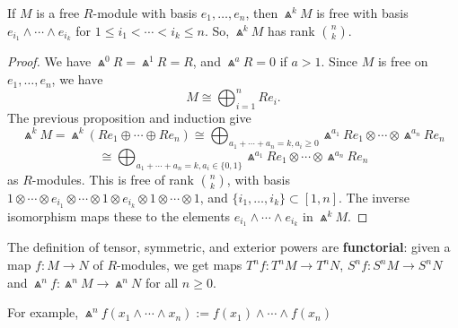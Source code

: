 \begin{cor}
    If $M$ is a free $R$-module with basis $e_1,\dots,e_n$, then $\Wedge^kM$ is free with basis $e_{i_1}\land \cdots \land e_{i_k}$ for $1 \leq i_1 < \cdots < i_k \leq n$. So, $\Wedge ^kM$ has rank $\binom{n}{k}$.
\end{cor}
\begin{proof}
    We have $\Wedge ^0R = \Wedge ^1R=R$, and $\Wedge^ aR =0$ if $a>1$. Since $M$ is free on $e_1,\dots,e_n$, we have
    $$ M \cong \bigoplus_{i=1}^nRe_i.$$
    The previous proposition and induction give
    $$\Wedge^kM = \Wedge^k(Re_1\oplus \cdots \oplus Re_n) \cong \bigoplus _{a_1+\cdots + a_n=k,a_i \geq 0}\Wedge^{a_1}Re_1 \otimes \cdots \otimes \Wedge^{a_n}Re_n$$
    $$\cong \bigoplus _{a_1+\cdots + a_n =k,a_i \in \{0,1\}} \Wedge^{a_1}Re_1 \otimes \cdots \otimes \Wedge^{a_n}Re_n$$
    as $R$-modules. This is free of rank $\binom{n}{k}$, with basis $1 \otimes \cdots \otimes e_{i_1}\otimes \cdots \otimes 1 \otimes e_{i_k}\otimes 1 \otimes \cdots \otimes 1$, and $\{ i_1,\dots,i_k\} \subset [1,n]$. The inverse isomorphism maps these to the elements $e_{i_1}\land \cdots \land e_{i_k}$ in $\Wedge^kM$.
\end{proof}

\begin{rmk}
    The definition of tensor, symmetric, and exterior powers are \textbf{functorial}: given a map $f : M \to N$ of $R$-modules, we get maps $T^nf:T^nM \to T^nN$, $S^nf : S^nM \to S^nN$ and $\Wedge ^nf : \Wedge ^nM \to \Wedge ^nN$ for all $n \geq 0$.

    For example, $\Wedge^nf(x_1\land \cdots \land x_n) := f(x_1) \land \cdots \land f(x_n)$
\end{rmk}


